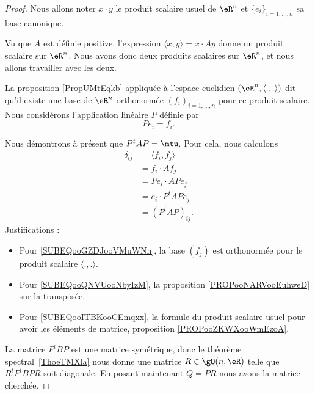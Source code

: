 \begin{proof}
    Nous allons noter \( x\cdot y\) le produit scalaire usuel de \( \eR^n\) et \( \{ e_i \}_{i=1,\ldots, n}\) sa base canonique.

    Vu que \( A\) est définie positive, l'expression \( \langle x, y\rangle =x\cdot Ay\) donne un produit scalaire sur \( \eR^n\). Nous avons donc deux produits scalaires sur \( \eR^n\), et nous allons travailler avec les deux.
    
    La proposition \ref{PropUMtEqkb} appliquée à l'espace euclidien \( (\eR^n,\langle ., .\rangle )\) dit qu'il existe une base de \( \eR^n\) orthonormée \( (f_i )_{i=1,\ldots, n}\) pour ce produit scalaire. Nous considérons l'application linéaire \( P\) définie par
    \begin{equation}
        Pe_i=f_i.
    \end{equation}

    Nous démontrons à présent que \( P^tAP=\mtu\). Pour cela, nous calculons
    \begin{subequations}
        \begin{align}
            \delta_{ij}&=\langle f_i, f_j\rangle    \label{SUBEQooGZDJooVMuWNn} \\
            &=f_i\cdot Af_j\\
            &=Pe_i\cdot APe_j       \\
            &=e_i\cdot P^tAPe_j     \label{SUBEQooQNVUooNbyIzM}\\
            &=(P^tAP)_{ij}.     \label{SUBEQooITBKooCEmqxx}
        \end{align}
    \end{subequations}
    Justifications :
    \begin{itemize}
        \item Pour \eqref{SUBEQooGZDJooVMuWNn}, la base \( (f_j)\) est orthonormée pour le produit scalaire \( \langle ., .\rangle \).
        \item Pour \eqref{SUBEQooQNVUooNbyIzM}, la proposition \ref{PROPooNARVooEuhweD} sur la transposée.
        \item Pour \eqref{SUBEQooITBKooCEmqxx}, la formule du produit scalaire usuel pour avoir les éléments de matrice, proposition \ref{PROPooZKWXooWmEzoA}.
    \end{itemize}
    La matrice \( P^tBP\) est une matrice symétrique, donc le théorème spectral~\ref{ThoeTMXla} nous donne une matrice \( R\in \gO(n,\eR)\) telle que \( R^tP^tBPR\) soit diagonale. En posant maintenant \( Q=PR\) nous avons la matrice cherchée.
\end{proof}

